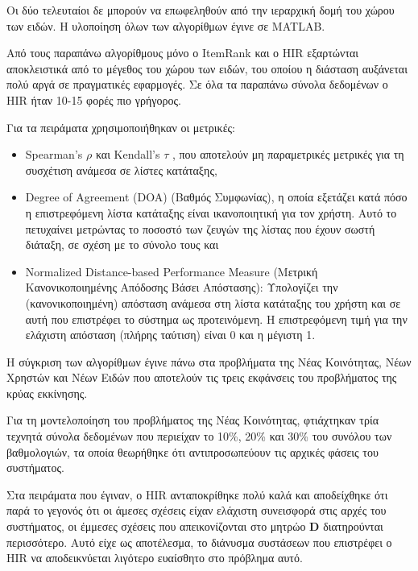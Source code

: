 Οι δύο τελευταίοι δε μπορούν να επωφεληθούν από την ιεραρχική δομή του χώρου των ειδών. Η υλοποίηση όλων των αλγορίθμων έγινε σε {\en MATLAB}. \par
Από τους παραπάνω αλγορίθμους μόνο ο {\en ItemRank} και ο {\en HIR} εξαρτώνται αποκλειστικά από το μέγεθος του χώρου των ειδών, του οποίου η διάσταση αυξάνεται πολύ αργά σε πραγματικές εφαρμογές. Σε όλα τα παραπάνω σύνολα δεδομένων ο {\en HIR} ήταν 10-15 φορές πιο γρήγορος. \par
Για τα πειράματα χρησιμοποιήθηκαν οι μετρικές:
\begin{itemize}
 \item {\en Spearman's $\rho$} \cite{mcdonald:statistics} και {\en Kendall's $\tau$} \cite{Kendall1948}, που αποτελούν μη παραμετρικές μετρικές για τη συσχέτιση ανάμεσα σε λίστες κατάταξης,
 \item {\en Degree of Agreement (DOA)} \cite{citeulike:1055526, Gori:2007:IRB:1625275.1625720} (Βαθμός Συμφωνίας), η οποία εξετάζει κατά πόσο η επιστρεφόμενη λίστα κατάταξης είναι ικανοποιητική για τον χρήστη. Αυτό το πετυχαίνει μετρώντας το ποσοστό των ζευγών της λίστας που έχουν σωστή διάταξη, σε σχέση με το σύνολο τους και
 \item {\en Normalized Distance-based Performance Measure} \cite{Yao95measuringretrieval, furnell2000proceedings} (Μετρική Κανονικοποιημένης Απόδοσης Βάσει Απόστασης): Υπολογίζει την (κανονικοποιημένη) απόσταση ανάμεσα στη λίστα κατάταξης του χρήστη και σε αυτή που επιστρέφει το σύστημα ως προτεινόμενη. Η επιστρεφόμενη τιμή για την ελάχιστη απόσταση (πλήρης ταύτιση) είναι 0 και η μέγιστη 1.  
\end{itemize}\par
H σύγκριση των αλγορίθμων έγινε πάνω στα προβλήματα της Νέας Κοινότητας, Νέων Χρηστών και Νέων Ειδών που αποτελούν τις τρεις 
εκφάνσεις του προβλήματος της κρύας εκκίνησης. \par
Για τη μοντελοποίηση του προβλήματος της Νέας Κοινότητας, φτιάχτηκαν τρία τεχνητά σύνολα δεδομένων που περιείχαν το 10\%, 20\% και 30\% του συνόλου των βαθμολογιών, τα οποία θεωρήθηκε ότι αντιπροσωπεύουν τις αρχικές φάσεις του συστήματος. \par
Στα πειράματα που έγιναν, ο {\en HIR} ανταποκρίθηκε πολύ καλά και αποδείχθηκε ότι παρά το γεγονός ότι οι άμεσες σχέσεις είχαν ελάχιστη συνεισφορά στις αρχές του συστήματος, οι έμμεσες σχέσεις που απεικονίζονται στο μητρώο $\mathbf{D}$ διατηρούνται περισσότερο. Αυτό είχε ως αποτέλεσμα, το διάνυσμα συστάσεων που επιστρέφει ο {\en HIR} να αποδεικνύεται λιγότερο ευαίσθητο στο πρόβλημα αυτό.\par
